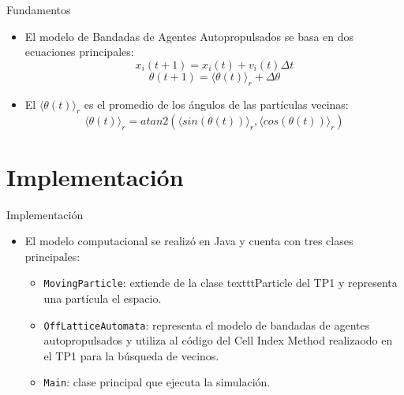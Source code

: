 \documentclass{beamer}
\begin{document}
    \begin{frame}{Fundamentos}
        \begin{itemize}
            \item El modelo de Bandadas de Agentes Autopropulsados se basa en dos ecuaciones principales:
                \begin{equation}
                    x_i(t+1) = x_i(t) + v_i(t) \Delta t\label{eq:equation1}
                \end{equation}
                \begin{equation}
                    \theta(t+1) = \langle \theta(t) \rangle_r+ \Delta \theta\label{eq:equation2}
                \end{equation}
            \item El $\langle \theta(t) \rangle_r$ es el promedio de los ángulos de las partículas vecinas:
                \begin{equation}
                    \langle \theta(t) \rangle_r = atan2(\langle sin(\theta(t)) \rangle_r, \langle cos(\theta(t)) \rangle_r)
                \end{equation}
        \end{itemize}
    \end{frame}

    \section{Implementación}

    \begin{frame}{Implementación}
        \begin{itemize}
            \item El modelo computacional se realizó en Java y cuenta con tres clases principales:
            \begin{itemize}
                \item \texttt{MovingParticle}: extiende de la clase texttt{Particle} del TP1 y representa una partícula
                el espacio.
                \item \texttt{OffLatticeAutomata}: representa el modelo de bandadas de agentes autopropulsados y utiliza
                al código del Cell Index Method realizaodo en el TP1 para la búsqueda de vecinos.
                \item \texttt{Main}: clase principal que ejecuta la simulación.
            \end{itemize}
        \end{itemize}
    \end{frame}
\end{document}

